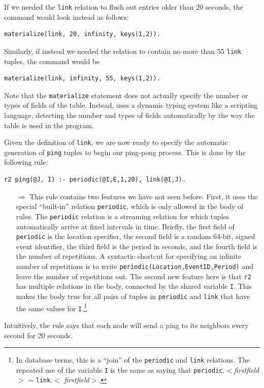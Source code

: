 \documentclass{article}
\begin{document}
If we needed the \lstinline$link$ relation to flush out entries older
than 20 seconds, the command would look instead as follows:
\begin{lstlisting}
materialize(link, 20, infinity, keys(1,2)).
\end{lstlisting}
Similarly, if instead we needed the relation to contain no more than 55
\lstinline$link$ tuples, the command would be
\begin{lstlisting}
materialize(link, infinity, 55, keys(1,2)).
\end{lstlisting}


Note that the \lstinline$materialize$ statement does not actually
specify the number or types of fields of the table.  Instead, \ol
uses a dynamic typing system like a scripting language, detecting the number and types of
fields automatically by the way the table is used in the program.

Given the definition of \lstinline$link$, we are now ready to specify
the automatic generation of \lstinline$ping$ tuples to begin our
ping-pong process.  This is done by the following rule:
\begin{lstlisting}
r2 ping(@J, I) :- periodic(@I,E,1,20), link(@I,J).
\end{lstlisting}

\begin{itemize}
\item[$\Longrightarrow$] This rule contains two features we have not
  seen before.  First, it uses the special ``built-in'' \ol relation
  \lstinline$periodic$, which is only allowed in the body of rules.  The
  \lstinline$periodic$ relation is a streaming relation for which tuples
  automatically arrive at fixed intervals in time. Briefly, the first
  field of \lstinline$periodic$ is the location specifier, the second
  field is a random 64-bit, signed event identifier, the third field is
  the period in seconds, and the fourth field is the number of
  repetitions. A syntactic shortcut for specifying an infinite number of
  repetitions is to write \lstinline$periodic(Location,EventID,Period)$
  and leave the number of repetitions out.
  The second new feature here is that \lstinline$r2$ has multiple
  relations in the body, connected by the shared variable \lstinline$I$.
  This makes the body true for all pairs of tuples in
  \lstinline$periodic$ and \lstinline$link$ that have the same values
  for \lstinline$I$.\footnote{In database terms, this is a ``join'' of
  the \lstinline$periodic$ and \lstinline$link$ relations.  The repeated
  use of the variable \lstinline$I$ is the same as saying that
  \lstinline$periodic$.$<${\em firstfield}$>$ = \lstinline$link$.$<${\em
  firstfield}$>$.}
\end{itemize}
\noindent
Intuitively, the rule says that each node will send a ping to its
neighbors every second for 20 seconds.
\end{document}
